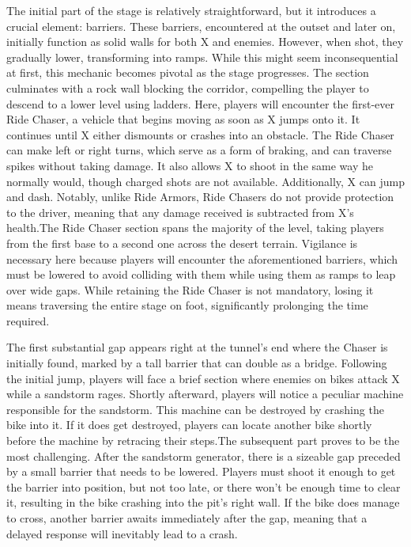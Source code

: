The initial part of the stage is relatively straightforward, but it introduces a crucial element: barriers. These barriers, encountered at the outset and later on, initially function as solid walls for both X and enemies. However, when shot, they gradually lower, transforming into ramps. While this might seem inconsequential at first, this mechanic becomes pivotal as the stage progresses. The section culminates with a rock wall blocking the corridor, compelling the player to descend to a lower level using ladders. Here, players will encounter the first-ever Ride Chaser, a vehicle that begins moving as soon as X jumps onto it. It continues until X either dismounts or crashes into an obstacle. The Ride Chaser can make left or right turns, which serve as a form of braking, and can traverse spikes without taking damage. It also allows X to shoot in the same way he normally would, though charged shots are not available. Additionally, X can jump and dash. Notably, unlike Ride Armors, Ride Chasers do not provide protection to the driver, meaning that any damage received is subtracted from X's health.The Ride Chaser section spans the majority of the level, taking players from the first base to a second one across the desert terrain. Vigilance is necessary here because players will encounter the aforementioned barriers, which must be lowered to avoid colliding with them while using them as ramps to leap over wide gaps. While retaining the Ride Chaser is not mandatory, losing it means traversing the entire stage on foot, significantly prolonging the time required.

The first substantial gap appears right at the tunnel's end where the Chaser is initially found, marked by a tall barrier that can double as a bridge. Following the initial jump, players will face a brief section where enemies on bikes attack X while a sandstorm rages. Shortly afterward, players will notice a peculiar machine responsible for the sandstorm. This machine can be destroyed by crashing the bike into it. If it does get destroyed, players can locate another bike shortly before the machine by retracing their steps.The subsequent part proves to be the most challenging. After the sandstorm generator, there is a sizeable gap preceded by a small barrier that needs to be lowered. Players must shoot it enough to get the barrier into position, but not too late, or there won't be enough time to clear it, resulting in the bike crashing into the pit's right wall. If the bike does manage to cross, another barrier awaits immediately after the gap, meaning that a delayed response will inevitably lead to a crash.

